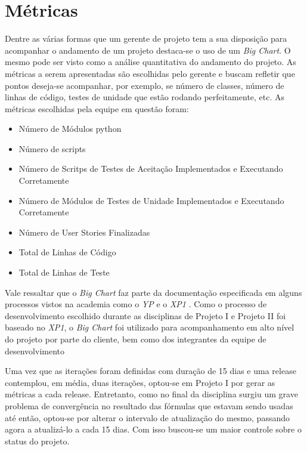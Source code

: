 \chapter{Métricas}

Dentre as várias formas que um gerente de projeto tem a sua disposição para acompanhar o andamento de um 
projeto destaca-se o uso de um \textit{Big Chart}. O mesmo pode ser visto como a análise quantitativa do 
andamento do projeto. As métricas a serem apresentadas são escolhidas pelo gerente e buscam refletir que 
pontos deseja-se acompanhar, por exemplo, se número de classes, número de linhas de código, testes de unidade 
que estão rodando perfeitamente, etc. As métricas escolhidas pela equipe em questão foram:

\begin{itemize}
 \item Número de Módulos python
 \item Número de scripts
 \item Número de Scritps de Testes de Aceitação Implementados e Executando Corretamente
 \item Número de Módulos de Testes de Unidade Implementados e Executando Corretamente
 \item Número de User Stories Finalizadas
 \item Total de Linhas de Código
 \item Total de Linhas de Teste
\end{itemize}


Vale ressaltar que o \textit{Big Chart} faz parte da documentação especificada em alguns processos vistos
 na academia como o \textit{YP} \cite{yp} e o \textit{XP1} \cite{xp1}. Como o processo de desenvolvimento 
escolhido durante as disciplinas de Projeto I e Projeto II foi baseado no \textit{XP1}, o \textit{Big Chart} 
foi utilizado para acompanhamento em alto nível do projeto por parte do cliente, bem como dos integrantes da 
equipe de desenvolvimento

Uma vez que as iterações foram definidas com duração de 15 dias e uma release contemplou, em média, duas 
iterações, optou-se em Projeto I por gerar as métricas a cada release. Entretanto, como no final da disciplina 
surgiu um grave problema de convergência no resultado das fórmulas que estavam sendo usadas até então, 
optou-se por alterar o intervalo de atualização do mesmo, passando agora a atualizá-lo a cada 15 dias. Com 
isso buscou-se um maior controle sobre o status do projeto.

